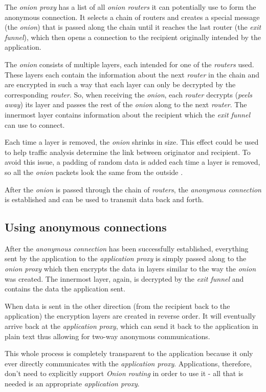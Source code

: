 \documentclass{sig-alternate}
\begin{document}
The \emph{onion proxy} has a list of all \emph{onion routers} it can potentially use to form
the anonymous connection. It selects a chain of routers and creates a special message (the \emph{onion})
that is passed along the chain until it reaches the last router (the \emph{exit funnel}), which then
opens a connection to the recipient originally intended by the application.

The \emph{onion} consists of multiple layers, each intended for one of the \emph{routers} used.
These layers each contain the information about the next \emph{router} in the chain and are encrypted
in such a way that each layer can only be decrypted by the corresponding \emph{router}. So, when receiving
the \emph{onion}, each \emph{router} decrypts (\emph{peels away}) its layer and passes the rest of the
\emph{onion} along to the next \emph{router}. The innermost layer contains information about the
recipient which the \emph{exit funnel} can use to connect.

Each time a layer is removed, the \emph{onion} shrinks in size. This effect could be used to help traffic
analysis determine the link between originator and recipient. To avoid this issue, a padding of random data
is added each time a layer is removed, so all the \emph{onion} packets look the same from the
outside \cite{ren2009}.

After the \emph{onion} is passed through the chain of \emph{routers}, the \emph{anonymous connection}
is established and can be used to transmit data back and forth.

\subsection{Using anonymous connections}
After the \emph{anonymous connection} has been successfully established, everything sent by the application
to the \emph{application proxy} is simply passed along to the \emph{onion proxy} which then encrypts the
data in layers similar to the way the \emph{onion} was created. The innermost layer, again, is decrypted
by the \emph{exit funnel} and contains the data the application sent.

When data is sent in the other direction (from the recipient back to the application) the encryption layers
are created in reverse order. It will eventually arrive back at the \emph{application proxy}, which can send
it back to the application in plain text thus allowing for two-way anonymous communications.

This whole process is completely transparent to the application because it only ever directly communicates
with the \emph{application proxy}. Applications, therefore, don't need to explicitly support
\emph{Onion routing} in order to use it - all that is needed is an appropriate \emph{application proxy}.
\end{document}
